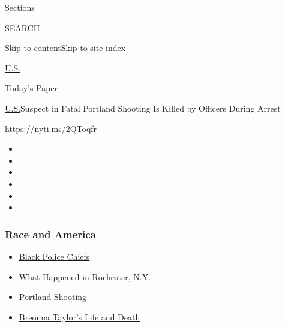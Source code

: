Sections

SEARCH

\protect\hyperlink{site-content}{Skip to
content}\protect\hyperlink{site-index}{Skip to site index}

\href{https://www.nytimes3xbfgragh.onion/section/us}{U.S.}

\href{https://myaccount.nytimes3xbfgragh.onion/auth/login?response_type=cookie\&client_id=vi}{}

\href{https://www.nytimes3xbfgragh.onion/section/todayspaper}{Today's
Paper}

\href{/section/us}{U.S.}\textbar{}Suspect in Fatal Portland Shooting Is
Killed by Officers During Arrest

\url{https://nyti.ms/2QToqfr}

\begin{itemize}
\item
\item
\item
\item
\item
\item
\end{itemize}

\hypertarget{race-and-america}{%
\subsubsection{\texorpdfstring{\href{https://www.nytimes3xbfgragh.onion/news-event/george-floyd-protests-minneapolis-new-york-los-angeles?name=styln-george-floyd\&region=TOP_BANNER\&block=storyline_menu_recirc\&action=click\&pgtype=Article\&impression_id=294d27a0-f4bd-11ea-a88e-3f25467b3361\&variant=undefined}{Race
and America}}{Race and America}}\label{race-and-america}}

\begin{itemize}
\tightlist
\item
  \href{https://www.nytimes3xbfgragh.onion/2020/09/11/us/black-police-chiefs-reform.html?name=styln-george-floyd\&region=TOP_BANNER\&block=storyline_menu_recirc\&action=click\&pgtype=Article\&impression_id=294d27a1-f4bd-11ea-a88e-3f25467b3361\&variant=undefined}{Black
  Police Chiefs}
\item
  \href{https://www.nytimes3xbfgragh.onion/2020/09/04/nyregion/rochester-police-daniel-prude.html?name=styln-george-floyd\&region=TOP_BANNER\&block=storyline_menu_recirc\&action=click\&pgtype=Article\&impression_id=294d4eb0-f4bd-11ea-a88e-3f25467b3361\&variant=undefined}{What
  Happened in Rochester, N.Y.}
\item
  \href{https://www.nytimes3xbfgragh.onion/2020/08/30/us/portland-shooting-explained.html?name=styln-george-floyd\&region=TOP_BANNER\&block=storyline_menu_recirc\&action=click\&pgtype=Article\&impression_id=294d4eb1-f4bd-11ea-a88e-3f25467b3361\&variant=undefined}{Portland
  Shooting}
\item
  \href{https://www.nytimes3xbfgragh.onion/2020/08/30/us/breonna-taylor-police-killing.html?name=styln-george-floyd\&region=TOP_BANNER\&block=storyline_menu_recirc\&action=click\&pgtype=Article\&impression_id=294d4eb2-f4bd-11ea-a88e-3f25467b3361\&variant=undefined}{Breonna
  Taylor's Life and Death}
\end{itemize}

